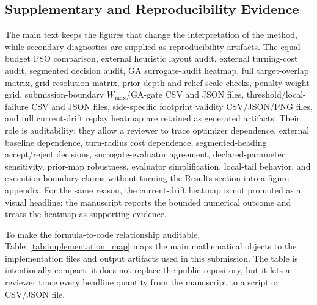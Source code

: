 \documentclass[jmse,article,submit,moreauthors]{Definitions/mdpi}
\begin{document}
\subsection{Supplementary and Reproducibility Evidence}
The main text keeps the figures that change the interpretation of the method, while secondary diagnostics are supplied as reproducibility artifacts. The equal-budget PSO comparison, external heuristic layout audit, external turning-cost audit, segmented decision audit, GA surrogate-audit heatmap, full target-overlap matrix, grid-resolution matrix, prior-depth and relief-scale checks, penalty-weight grid, submission-boundary \(W_{\max}\)/GA-gate CSV and JSON files, threshold/local-failure CSV and JSON files, side-specific footprint validity CSV/JSON/PNG files, and full current-drift replay heatmap are retained as generated artifacts. Their role is auditability: they allow a reviewer to trace optimizer dependence, external baseline dependence, turn-radius cost dependence, segmented-heading accept/reject decisions, surrogate-evaluator agreement, declared-parameter sensitivity, prior-map robustness, evaluator simplification, local-tail behavior, and execution-boundary claims without turning the Results section into a figure appendix. For the same reason, the current-drift heatmap is not promoted as a visual headline; the manuscript reports the bounded numerical outcome and treats the heatmap as supporting evidence.

To make the formula-to-code relationship auditable, Table~\ref{tab:implementation_map} maps the main mathematical objects to the implementation files and output artifacts used in this submission. The table is intentionally compact: it does not replace the public repository, but it lets a reviewer trace every headline quantity from the manuscript to a script or CSV/JSON file.
\end{document}
